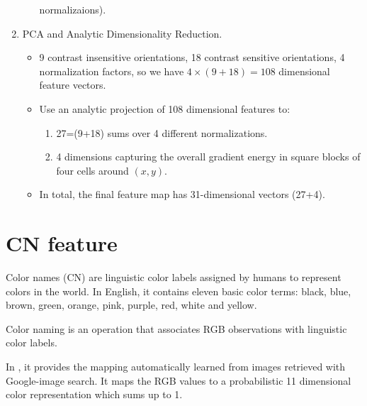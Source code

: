 \documentclass[12pt]{article}
\numberwithin{equation}{section}
\begin{document}
\begin{enumerate}
\begin{itemize}
			normalizaions).
		\end{itemize}		
	\item PCA and Analytic Dimensionality Reduction.
		\begin{itemize}
			\item 9 contrast insensitive orientations, 18 contrast sensitive orientations, 4 normalization factors, 
			so we have $4 \times (9+18)=108$ dimensional feature vectors. 
			\item Use an analytic projection of 108 dimensional features to:
				\begin{enumerate}
			 		\item 27=(9+18) sums over 4 different normalizations.
					\item 4 dimensions capturing the overall gradient energy in square blocks of four cells 
					around $(x,y)$. 
				\end{enumerate}
			\item In total, the final feature map has 31-dimensional vectors (27+4).
		\end{itemize}	
\end{enumerate}
\section{CN feature \cite{van2007learning}}
Color names (CN) are linguistic color labels assigned by humans to represent colors in the world. In English, it contains eleven basic color terms: black, blue, brown, green, orange, pink, purple, red, white and yellow. \par
Color naming is an operation that associates RGB observations with linguistic color labels.  \par
In \cite{van2007learning}, it provides the mapping automatically learned from images retrieved with Google-image search. It maps the RGB values to a probabilistic 11 dimensional color representation which sums up to 1. \par
\end{document}
